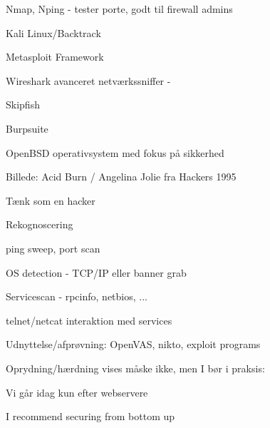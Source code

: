\documentclass[Screen16to9,17pt]{foils}
\begin{document}


\begin{list2}
\item Nmap, Nping - tester porte, godt til firewall admins 
\item Kali Linux/Backtrack 
\item Metasploit Framework 
\item Wireshark avanceret netværkssniffer - 
\item Skipfish 
\item Burpsuite 
\item OpenBSD operativsystem med fokus
  på sikkerhed  
\end{list2}

Billede: Acid Burn / Angelina Jolie fra Hackers 1995

%

\begin{list1}
\item Tænk som en hacker
\item Rekognoscering
\begin{list2}
\item ping sweep, port scan
\item OS detection - TCP/IP eller banner grab
\item Servicescan - rpcinfo, netbios, ...
\item telnet/netcat interaktion med services
\end{list2}
\item Udnyttelse/afprøvning: OpenVAS, nikto, exploit programs
\item Oprydning/hærdning vises måske ikke, men I bør i praksis:
\end{list1}

\vskip 2cm
\centerline{\hlkbig Vi går idag kun efter webservere}




I recommend securing from bottom up


\end{document}
